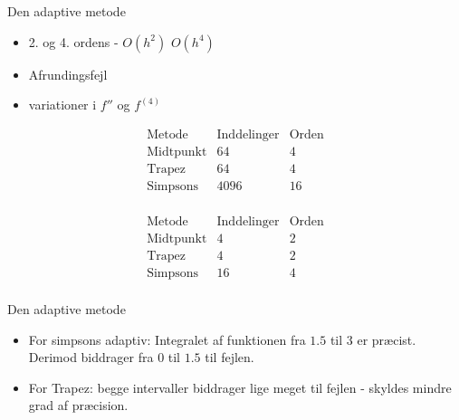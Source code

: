 \begin{frame}{Den adaptive metode}
    \begin{itemize}
        \item 2. og 4. ordens - $O(h^2)$ $O(h^4)$
        \item Afrundingsfejl
        \item variationer i $f''$ og $f^{(4)}$
    \end{itemize}
    
$$\begin{array}{l|c|c}
\text{Metode} & \text{Inddelinger}& \text{Orden} \\
\hline
\text{Midtpunkt}	& 64		& 4 \\
\text{Trapez}		& 64		& 4 \\
\text{Simpsons}		& 4096	& 16 \\
\end{array}$$

$$\begin{array}{l|c|c}
\text{Metode} & \text{Inddelinger}& \text{Orden} \\
\hline
\text{Midtpunkt}	& 4		& 2 \\
\text{Trapez}		& 4		& 2 \\
\text{Simpsons}		& 16	& 4 \\
\end{array}$$

\end{frame}


\begin{frame}{Den adaptive metode}
    \begin{itemize}
        \item For simpsons adaptiv: Integralet af funktionen fra $1.5$ til $3$ er præcist. 
        Derimod biddrager fra $0$ til $1.5$ til fejlen.
        \item For Trapez:  begge intervaller biddrager lige meget til fejlen - skyldes mindre grad af præcision.
    \end{itemize}
\end{frame}